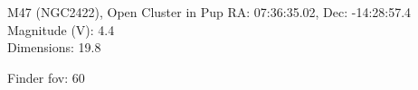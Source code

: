\begin{block}{M47 (NGC2422), Open Cluster in Pup}
    RA: 07:36:35.02, Dec: -14:28:57.4 \\ 
    Magnitude (V): 4.4 \\ 
    Dimensions: 19.8 

    Finder fov: 60 
\end{block}